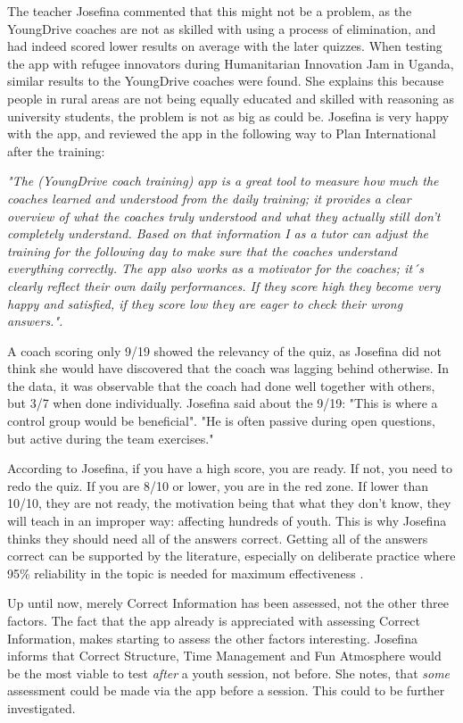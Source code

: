     The teacher Josefina commented that this might not be a problem, as the YoungDrive coaches are not as skilled with using a process of elimination, and had indeed scored lower results on average with the later quizzes. When testing the app with refugee innovators during Humanitarian Innovation Jam in Uganda, similar results to the YoungDrive coaches were found. She explains this because people in rural areas are not being equally educated and skilled with reasoning as university students, the problem is not as big as could be. Josefina is very happy with the app, and reviewed the app in the following way to Plan International after the training:

\textit{"The (YoungDrive coach training) app is a great tool to measure how much the coaches learned and understood from the daily training; it provides a clear overview of what the coaches truly understood and what they actually still don’t completely understand. Based on that information I as a tutor can adjust the training for the following day to make sure that the coaches understand everything correctly. The app also works as a motivator for the coaches; it´s clearly reflect their own daily performances. If they score high they become very happy and satisfied, if they score low they are eager to check their wrong answers.".}

A coach scoring only 9/19 showed the relevancy of the quiz, as Josefina did not think she would have discovered that the coach was lagging behind otherwise. In the data, it was observable that the coach had done well together with others, but 3/7 when done individually. Josefina said about the 9/19: "This is where a control group would be beneficial". "He is often passive during open questions, but active during the team exercises."

According to Josefina, if you have a high score, you are ready. If not, you need to redo the quiz. If you are 8/10 or lower, you are in the red zone. If lower than 10/10, they are not ready, the motivation being that what they don't know, they will teach in an improper way: affecting hundreds of youth. This is why Josefina thinks they should need all of the answers correct. Getting all of the answers correct can be supported by the literature, especially on deliberate practice where 95\% reliability in the topic is needed for maximum effectiveness \citep{sierra}.

Up until now, merely Correct Information has been assessed, not the other three factors. The fact that the app already is appreciated with assessing Correct Information, makes starting to assess the other factors interesting. Josefina informs that Correct Structure, Time Management and Fun Atmosphere would be the most viable to test \textit{after} a youth session, not before. She notes, that \textit{some} assessment could be made via the app before a session. This could to be further investigated.
